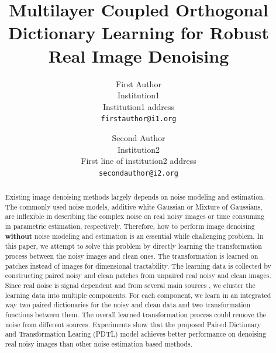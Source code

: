 \documentclass[10pt,twocolumn,letterpaper]{article}
\begin{document}
\title{Multilayer Coupled Orthogonal Dictionary Learning for Robust Real Image Denoising}

\author{First Author\\
Institution1\\
Institution1 address\\
{\tt\small firstauthor@i1.org}
\and
Second Author\\
Institution2\\
First line of institution2 address\\
{\tt\small secondauthor@i2.org}
}

\maketitle

\begin{abstract}
Existing image denoising methods largely depends on noise modeling and estimation. The commonly used noise models, additive white Gaussian or Mixture of Gaussians, are inflexible in describing the complex noise on real noisy images or time consuming in parametric estimation, respectively. Therefore, how to perform image denoising \textbf{without} noise modeling and estimation is an essential while challenging problem. In this paper, we attempt to solve this problem by directly learning the transformation process between the noisy images and clean ones. The transformation is learned on patches instead of images for dimensional tractability. The learning data is collected by constructing paired noisy and clean patches from unpaired real noisy and clean images. Since real noise is signal dependent and from several main sources \cite{healey1994radiometric}, we cluster the learning data into multiple components. For each component, we learn in an integrated way two paired dictionaries for the noisy and clean data and two transformation functions between them. The overall learned transformation process could remove the noise from different sources. Experiments show that the proposed Paired Dictionary and Transformation Learing (PDTL) model achieves better performance on denoising real noisy images than other noise estimation based methods.
\end{abstract}
\end{document}
